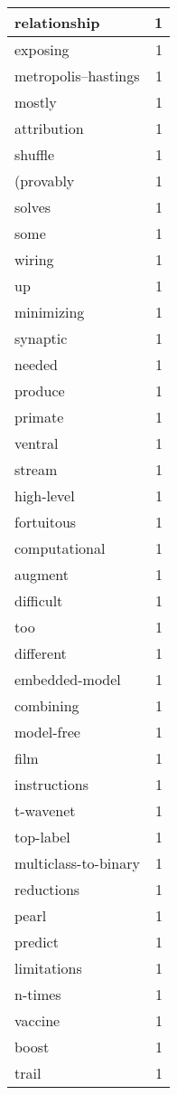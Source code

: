 \begin{table}[h]
\begin{tabular}{|l|r|}
\hline
relationship & 1 \\
\hline
exposing & 1 \\
\hline
metropolis--hastings & 1 \\
\hline
mostly & 1 \\
\hline
attribution & 1 \\
\hline
shuffle & 1 \\
\hline
(provably & 1 \\
\hline
solves & 1 \\
\hline
some & 1 \\
\hline
wiring & 1 \\
\hline
up & 1 \\
\hline
minimizing & 1 \\
\hline
synaptic & 1 \\
\hline
needed & 1 \\
\hline
produce & 1 \\
\hline
primate & 1 \\
\hline
ventral & 1 \\
\hline
stream & 1 \\
\hline
high-level & 1 \\
\hline
fortuitous & 1 \\
\hline
computational & 1 \\
\hline
augment & 1 \\
\hline
difficult & 1 \\
\hline
too & 1 \\
\hline
different & 1 \\
\hline
embedded-model & 1 \\
\hline
combining & 1 \\
\hline
model-free & 1 \\
\hline
film & 1 \\
\hline
instructions & 1 \\
\hline
t-wavenet & 1 \\
\hline
top-label & 1 \\
\hline
multiclass-to-binary & 1 \\
\hline
reductions & 1 \\
\hline
pearl & 1 \\
\hline
predict & 1 \\
\hline
limitations & 1 \\
\hline
n-times & 1 \\
\hline
vaccine & 1 \\
\hline
boost & 1 \\
\hline
trail & 1 \\

\end{tabular}
\end{table}
